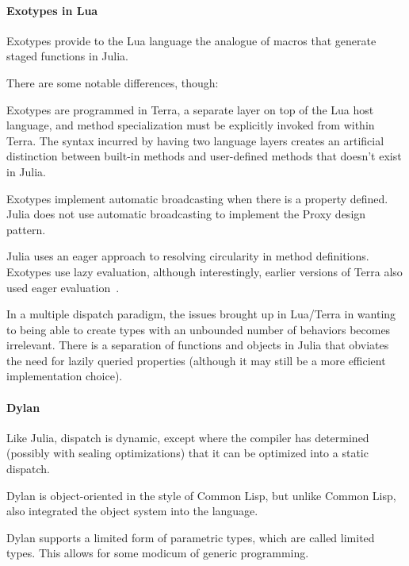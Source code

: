 \paragraph{Exotypes in Lua}
Exotypes\cite{exotypes} provide to the Lua language\cite{lua} the analogue of macros that generate staged functions\cite{stagedfunc} in Julia.

There are some notable differences, though:

Exotypes are programmed in Terra,\cite{terra} a separate layer on top of the Lua host language, and method specialization must be explicitly invoked from within Terra. The syntax incurred by having two language layers creates an artificial distinction between built-in methods and user-defined methods that doesn't exist in Julia.

Exotypes implement automatic broadcasting when there is a  property defined. Julia does not use automatic broadcasting to implement the Proxy design pattern.

Julia uses an eager approach to resolving circularity in method definitions. Exotypes use lazy evaluation, although interestingly, earlier versions of Terra also used eager evaluation~\cite{terra}.


In a multiple dispatch paradigm, the issues brought up in Lua/Terra in wanting to being able to create types with an unbounded number of behaviors becomes irrelevant. There is a separation of functions and objects in Julia that obviates the need for lazily queried properties (although it may still be a more efficient implementation choice).

\paragraph{Dylan}

Like Julia, dispatch is dynamic, except where the compiler has determined (possibly with sealing optimizations) that it can be optimized into a static dispatch.

Dylan is object-oriented in the style of Common Lisp, but unlike Common Lisp, also integrated the object system into the language. 

Dylan supports a limited form of parametric types, which are called limited types.\cite{dylanman} This allows for some modicum of generic programming.

